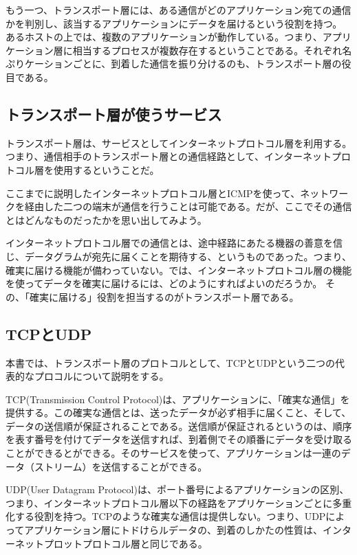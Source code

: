 もう一つ、トランスポート層には、ある通信がどのアプリケーション宛ての通信かを判別し、該当するアプリケーションにデータを届けるという役割を持つ。
あるホストの上では、複数のアプリケーションが動作している。つまり、アプリケーション層に相当するプロセスが複数存在するということである。それぞれ名ぷりケーションごとに、到着した通信を振り分けるのも、トランスポート層の役目である。


\subsection{トランスポート層が使うサービス}

トランスポート層は、サービスとしてインターネットプロトコル層を利用する。つまり、通信相手のトランスポート層との通信経路として、インターネットプロトコル層を使用するということだ。

ここまでに説明したインターネットプロトコル層とICMPを使って、ネットワークを経由した二つの端末が通信を行うことは可能である。だが、ここでその通信とはどんなものだったかを思い出してみよう。

インターネットプロトコル層での通信とは、途中経路にあたる機器の善意を信じ、データグラムが宛先に届くことを期待する、というものであった。つまり、確実に届ける機能が備わっていない。では、インターネットプロトコル層の機能を使ってデータを確実に届けるには、どのようにすればよいのだろうか。
その、「確実に届ける」役割を担当するのがトランスポート層である。

\subsection{TCPとUDP}
本書では、トランスポート層のプロトコルとして、TCPとUDPという二つの代表的なプロコルについて説明をする。

TCP(Transmission Control Protocol)は、アプリケーションに、「確実な通信」を提供する。この確実な通信とは、送ったデータが必ず相手に届くこと、そして、データの送信順が保証されることである。送信順が保証されるというのは、順序を表す番号を付けてデータを送信すれば、到着側でその順番にデータを受け取ることができるとができる。そのサービスを使って、アプリケーションは一連のデータ（ストリーム）を送信することができる。

UDP(User Datagram Protocol)は、ポート番号によるアプリケーションの区別、つまり、インターネットプロトコル層以下の経路をアプリケーションごとに多重化する役割を持つ。TCPのような確実な通信は提供しない。つまり、UDPによってアプリケーション層にトドけらルデータの、到着のしかたの性質は、インターネットプロットプロトコル層と同じである。

